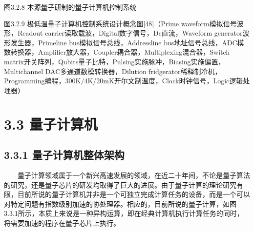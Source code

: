 \documentclass[a4paper,11pt,english]{sphinxmanual}
\begin{document}
\begin{center}图3.2.8 本源量子研制的量子计算机控制系统
\end{center}

\begin{center}图3.2.9 极低温量子计算机控制系统设计概念图{[}48{]}（Prime waveform\sphinxhyphen{}模拟信号波形，Readout carrier\sphinxhyphen{}读取载波，Digital\sphinxhyphen{}数字信号，Dc\sphinxhyphen{}直流，Waveform generator\sphinxhyphen{}波形发生器，Prime\sphinxhyphen{}line bus\sphinxhyphen{}模拟信号总线，Address\sphinxhyphen{}line bus\sphinxhyphen{}地址信号总线，ADC\sphinxhyphen{}模数转换器，Amplifier\sphinxhyphen{}放大器，Coupler\sphinxhyphen{}耦合器，Multiplexing\sphinxhyphen{}混合器，Switch matrix\sphinxhyphen{}开关阵列，Qubits\sphinxhyphen{}量子比特，Pulsing\sphinxhyphen{}实施脉冲，Biasing\sphinxhyphen{}实施偏置，Multi\sphinxhyphen{}channel DAC\sphinxhyphen{}多通道数模转换器，Dilution fridgerator\sphinxhyphen{}稀释制冷机，Programming\sphinxhyphen{}编程，300K/4K/20mK\sphinxhyphen{}开尔文制温度，Clock\sphinxhyphen{}时钟信号，Logic\sphinxhyphen{}逻辑处理器）
\end{center}
\sphinxstepscope


\section{3.3 量子计算机}
\label{\detokenize{rst/3.3_u91cf_u5b50_u8ba1_u7b97_u673a:id1}}\label{\detokenize{rst/3.3_u91cf_u5b50_u8ba1_u7b97_u673a::doc}}

\subsection{3.3.1 量子计算机整体架构}
\label{\detokenize{rst/3.3_u91cf_u5b50_u8ba1_u7b97_u673a:id2}}
\sphinxAtStartPar
{}

\sphinxAtStartPar
  量子计算领域属于一个新兴高速发展的领域，在近二十年间，不论是量子算法的研究，还是量子芯片的研发均取得了巨大的进展。由于量子计算的理论研究有限，目前所说的量子计算机并非是一个可独立完成计算任务的设备，而是一个可以对特定问题有指数级别加速的协处理器。相应的，目前所说的量子计算，如图3.3.1所示，本质上来说是一种异构运算，即在经典计算机执行计算任务的同时，将需要加速的程序在量子芯片上执行。

\end{document}
